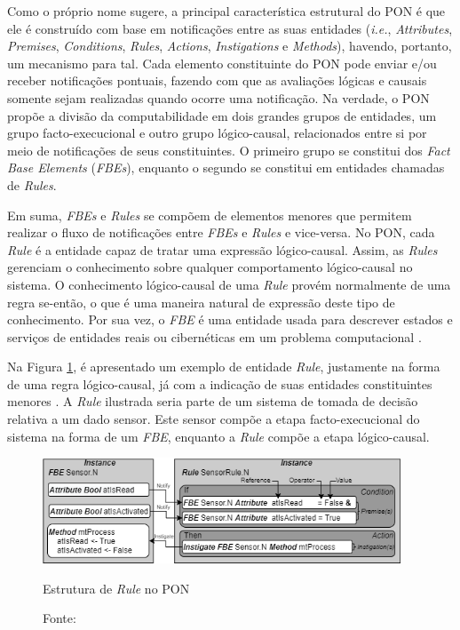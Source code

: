 Como o próprio nome sugere, a principal característica estrutural do PON é que
ele é construído com base em notificações entre as suas entidades
(\textit{i.e.}, \textit{Attributes}, \textit{Premises}, \textit{Conditions},
\textit{Rules}, \textit{Actions}, \textit{Instigations} e \textit{Methods}),
havendo, portanto, um mecanismo para tal. Cada elemento constituinte do PON pode
enviar e/ou receber notificações pontuais, fazendo com que as avaliações lógicas
e causais somente sejam realizadas quando ocorre uma notificação. Na verdade, o
PON propõe a divisão da computabilidade em dois grandes grupos de entidades, um
grupo facto-execucional e outro grupo lógico-causal, relacionados entre si por
meio de notificações de seus constituintes. O primeiro grupo se constitui dos
\textit{Fact Base Elements} (\textit{FBEs}), enquanto o segundo se constitui em
entidades chamadas de \textit{Rules}.

Em suma, \textit{FBEs} e \textit{Rules} se compõem de elementos menores que
permitem realizar o fluxo de notificações entre \textit{FBEs} e \textit{Rules} e
vice-versa. No PON, cada \textit{Rule} é a entidade capaz de tratar uma
expressão lógico-causal. Assim, as \textit{Rules} gerenciam o conhecimento sobre
qualquer comportamento lógico-causal no sistema. O conhecimento lógico-causal de
uma \textit{Rule} provém normalmente de uma regra se-então, o que é uma maneira
natural de expressão deste tipo de conhecimento. Por sua vez, o \textit{FBE} é
uma entidade usada para descrever estados e serviços de entidades reais ou
cibernéticas em um problema computacional \cite{msc_Banaszewski_2009}.

Na Figura \ref{fig:nop_rule}, é apresentado um exemplo de entidade
\textit{Rule}, justamente na forma de uma regra lógico-causal, já com a
indicação de suas entidades constituintes menores \cite{neves_icist_2021}. A
\textit{Rule} ilustrada seria parte de um sistema de tomada de decisão relativa
a um dado sensor. Este sensor compõe a etapa facto-execucional do sistema na
forma de um \textit{FBE}, enquanto a \textit{Rule} compõe a etapa lógico-causal.

\begin{figure}[!htb]
  \centering
  \includegraphics[width=0.95\textwidth]{../figures/rule_sensor_icist.png}
  \smallskip\smallskip\smallskip \caption{Estrutura de \textit{Rule} no PON}
  \caption*{Fonte: }
  \label{fig:nop_rule}
\end{figure}

